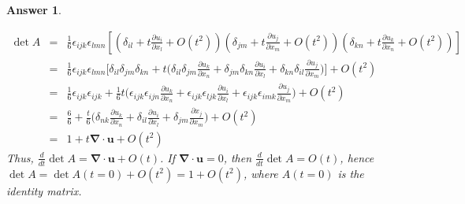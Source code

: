 \documentclass[a4paper]{article}
\newtheorem{ans}{Answer}[section]
\theoremstyle{new}
\begin{document}
\begin{ans}
\begin{enumerate}[label=(\roman*)]
\begin{eqnarray}
\det A&=&\frac{1}{6}\epsilon_{ijk}\epsilon_{lmn}[(\delta_{il}+t\frac{\partial u_i}{\partial x_l}+O(t^2))(\delta_{jm}+t\frac{\partial u_j}{\partial x_m}+O(t^2))(\delta_{kn}+t\frac{\partial u_k}{\partial x_n}+O(t^2))]\nonumber\\&=&\frac{1}{6}\epsilon_{ijk}\epsilon_{lmn}\bigg[\delta_{il}\delta_{jm}\delta_{kn}+t\bigg(\delta_{il}\delta_{jm}\frac{\partial u_k}{\partial x_n}+\delta_{jm}\delta_{kn}\frac{\partial u_i}{\partial x_l}+\delta_{kn}\delta_{il}\frac{\partial u_j}{\partial x_m}\bigg)\bigg]+O(t^2)\nonumber\\&=&\frac{1}{6}\epsilon_{ijk}\epsilon_{ijk}+\frac{1}{6}t\bigg(\epsilon_{ijk}\epsilon_{ijn}\frac{\partial u_k}{\partial x_n}+\epsilon_{ijk}\epsilon_{ljk}\frac{\partial u_i}{\partial x_l}+\epsilon_{ijk}\epsilon_{imk}\frac{\partial u_j}{\partial x_m}\bigg)+O(t^2)\nonumber\\&=&\frac{6}{6}+\frac{t}{6}\bigg(\delta_{nk}\frac{\partial u_k}{\partial x_n}+\delta_{il}\frac{\partial u_i}{\partial x_l}+\delta_{jm}\frac{\partial x_j}{\partial x_m}\bigg)+O(t^2)\nonumber\\&=&1+t\boldsymbol{\nabla}\cdot\mathbf{u}+O(t^2)\nonumber
\end{eqnarray}
Thus, $\frac{d}{dt}\det A=\boldsymbol{\nabla}\cdot\mathbf{u}+O(t)$. If $\boldsymbol{\nabla}\cdot\mathbf{u}=0$, then $\frac{d}{dt}\det A=O(t)$, hence $\det A=\det A(t=0)+O(t^2)=1+O(t^2)$, where $A(t=0)$ is the identity matrix.
\end{enumerate}
\end{ans}
\newpage
\end{document}
